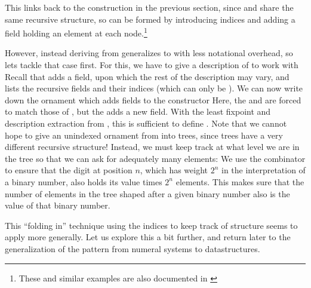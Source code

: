 This links back to the construction in the previous section, since \bN{} and  share the same recursive structure, so  can be formed by introducing indices and adding a field holding an element at each node.\footnote{These and similar examples are also documented in \cite{progorn}} 

However, instead deriving  from \bN{} generalizes to \bL{} with less notational overhead, so lets tackle that case first. For this, we have to give a description of \bN{} to work with
Recall that  adds a field, upon which the rest of the description may vary, and  lists the recursive fields and their indices (which can only be ).
We can now write down the ornament which adds fields to the  constructor
Here, the  and  are forced to match those of ,
but the  adds a new field. With the least fixpoint and description extraction from \cite{progorn}, this is sufficient to define . Note that we cannot hope to give an unindexed ornament from \bL{}
into trees, since trees have a very different recursive structure! Instead, we must keep track at what level we are in the tree so that we can ask for adequately many elements:
We use the  combinator to ensure that the digit at position $n$, which has weight $2^n$ in the interpretation of a binary number, also holds its value times $2^n$ elements. This makes sure that the number of elements in the tree shaped after a given binary number also is the value of that  binary number.

This ``folding in'' technique using the indices to keep track of structure seems to apply more generally. Let us explore this a bit further, and return later to the generalization of the pattern from numeral systems to datastructures.

